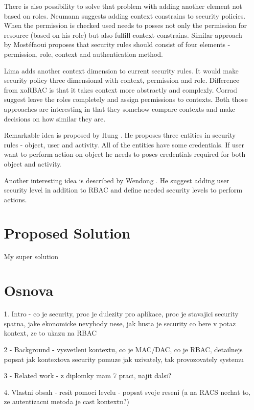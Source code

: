 \documentclass{poster15}
\begin{document}
There is also possibility to solve that problem with adding another element not based on roles. Neumann \cite{xorbac} suggests adding context constrains to security policies. When the permission is checked used needs to posses not only the permission for resource (based on his role) but also fulfill context constrains. Similar approach by Most\'efaoui \cite{genericcontext} proposes that security rules should consist of four elements - permission, role, context and authentication method.

Lima \cite{contextlayer} adds another context dimension to current security rules. It would make security policy three dimensional with context, permission and role. Difference from xoRBAC \cite{xorbac} is that it takes context more abstractly and complexly. Corrad \cite{ubiscom} suggest leave the roles completely and assign permissions to contexts. Both those approaches are interesting in that they somehow compare contexts and make decisions on how similar they are.

Remarkable idea is proposed by Hung \cite{hung}. He proposes three entities in security rules - object, user and activity. All of the entities have some credentials. If user want to perform action on object he needs to poses credentials required for both object and activity.

Another interesting idea is described by Wendong \cite{wendong}. He suggest adding user security level in addition to RBAC and define needed security levels to perform actions.

\section{Proposed Solution}

My super solution

\section{Osnova}
1. Intro - co je security, proc je dulezity pro aplikace, proc je stavajici security spatna, jake ekonomicke nevyhody nese, jak husta je security co bere v potaz kontext, ze to ukazu na RBAC

2 - Background - vysvetleni kontextu, co je MAC/DAC, co je RBAC, detailnejs popsat jak kontextova security pomuze jak uzivately, tak provozovately systemu

3 - Related work - z diplomky mam 7 praci, najit dalsi?

4. Vlastni obsah - resit pomoci levelu - popsat svoje reseni (a na RACS nechat to, ze autentizacni metoda je cast kontextu?)
\end{document}
